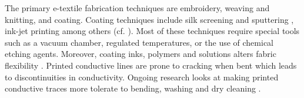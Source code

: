 The primary e-textile fabrication techniques are embroidery, weaving and knitting, and coating. 
Coating techniques include silk screening and sputtering \cite{kim2010electrical}, ink-jet printing \cite{stempien2017shape} among others (cf. \cite{castano2014smart}). %
Most of these techniques require special tools such as a vacuum chamber, regulated temperatures, or the use of chemical etching agents. 
Moreover, coating inks, polymers and solutions alters fabric flexibility \cite{farboodmanesh2005effect}. 
Printed conductive lines are prone to cracking when bent which leads to discontinuities in conductivity. 
Ongoing research looks at making printed conductive traces more tolerate to bending, washing and dry cleaning \cite{yang2013waterproof,stempien2017shape}.




